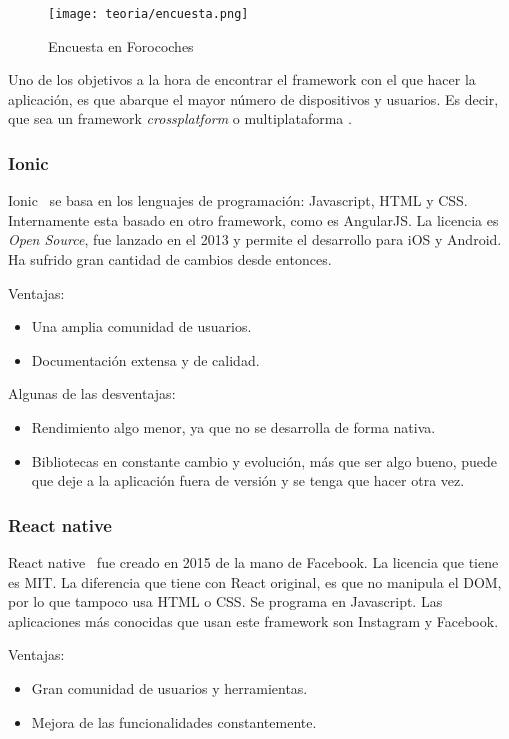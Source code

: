 \begin{figure}[h]
	\centering
	\texttt{[image: teoria/encuesta.png]}
	\caption{Encuesta en Forocoches}\label{fig:encuesta}
\end{figure}

Uno de los objetivos a la hora de encontrar el framework con el que hacer la aplicación, es que abarque el mayor número de dispositivos y usuarios. Es decir, que sea un framework \emph{crossplatform} o multiplataforma .

\subsubsection{Ionic}
Ionic~\cite{wiki:ionnic} se basa en los lenguajes de programación: Javascript, HTML y CSS. Internamente esta basado en otro framework, como es AngularJS. La licencia es \emph{Open Source}, fue lanzado en el 2013 y permite el desarrollo para iOS y Android. Ha sufrido gran cantidad de cambios desde entonces.

Ventajas:
\begin{itemize}
	\item Una amplia comunidad de usuarios.
	\item Documentación extensa y de calidad.
\end{itemize}

Algunas de las desventajas:
\begin{itemize}
	\item Rendimiento algo menor, ya que no se desarrolla de forma nativa.
	\item Bibliotecas en constante cambio y evolución, más que ser algo bueno, puede que deje a la aplicación fuera de versión y se tenga que hacer otra vez.
\end{itemize}

\subsubsection{React native}
React native~\cite{wiki:react} fue creado en 2015 de la mano de Facebook. La licencia que tiene es MIT. La diferencia que tiene con React original, es que no manipula el DOM, por lo que tampoco usa HTML o CSS. 
Se programa en Javascript. Las aplicaciones más conocidas que usan este framework son Instagram y Facebook.

Ventajas:
\begin{itemize}
	\item Gran comunidad de usuarios y herramientas.
	\item Mejora de las funcionalidades constantemente.
\end{itemize}

